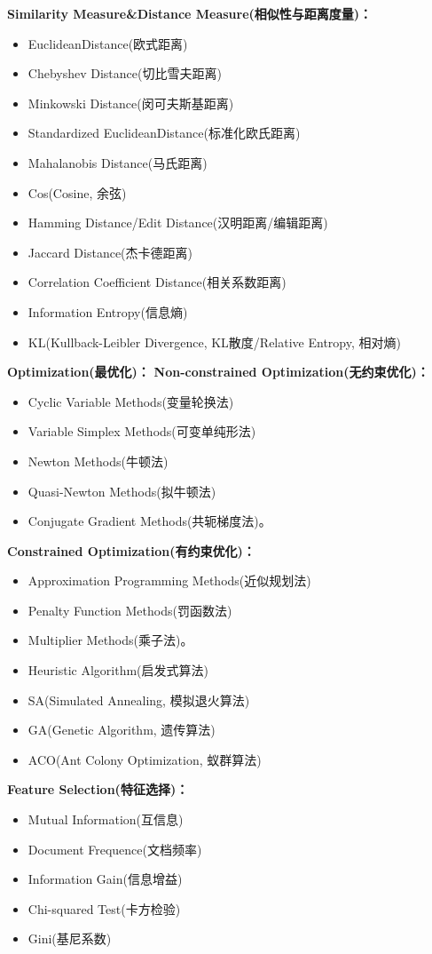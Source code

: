 \documentclass[10pt,a4paper]{ctexbook}
\begin{document}
\textbf{Similarity Measure\&Distance Measure(相似性与距离度量)：}
\begin{itemize}
\item EuclideanDistance(欧式距离)
\item Chebyshev Distance(切比雪夫距离)
\item Minkowski Distance(闵可夫斯基距离)
\item Standardized EuclideanDistance(标准化欧氏距离)
\item Mahalanobis Distance(马氏距离)
\item Cos(Cosine, 余弦)
\item Hamming Distance/Edit Distance(汉明距离/编辑距离)
\item Jaccard Distance(杰卡德距离)
\item Correlation Coefficient Distance(相关系数距离)
\item Information Entropy(信息熵)
\item KL(Kullback-Leibler Divergence, KL散度/Relative Entropy, 相对熵)
\end{itemize}

\textbf{Optimization(最优化)：}
\textbf{Non-constrained Optimization(无约束优化)：}
\begin{itemize}
\item Cyclic Variable Methods(变量轮换法)
\item Variable Simplex Methods(可变单纯形法)
\item Newton Methods(牛顿法)
\item Quasi-Newton Methods(拟牛顿法)
\item Conjugate Gradient Methods(共轭梯度法)。
\end{itemize}

\textbf{Constrained Optimization(有约束优化)：}
\begin{itemize}
\item Approximation Programming Methods(近似规划法)
\item Penalty Function Methods(罚函数法)
\item Multiplier Methods(乘子法)。
\item Heuristic Algorithm(启发式算法)
\item SA(Simulated Annealing, 模拟退火算法)
\item GA(Genetic Algorithm, 遗传算法)
\item ACO(Ant Colony Optimization, 蚁群算法)
\end{itemize}

\textbf{Feature Selection(特征选择)：}
\begin{itemize}
\item Mutual Information(互信息)
\item Document Frequence(文档频率)
\item Information Gain(信息增益)
\item Chi-squared Test(卡方检验)
\item Gini(基尼系数)
\end{itemize}
\end{document}

